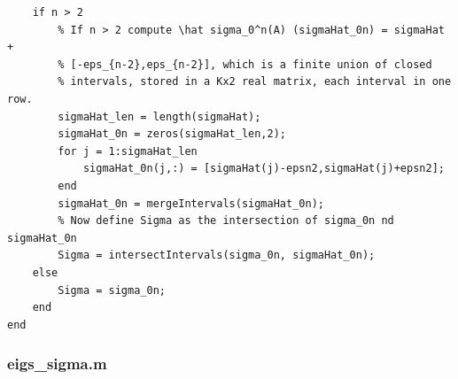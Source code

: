 \documentclass[preprint,1p,11pt]{elsarticle}
\numberwithin{equation}{section}   %
\numberwithin{figure}{section}  %
\begin{document}
\begin{verbatim}
    if n > 2
        % If n > 2 compute \hat sigma_0^n(A) (sigmaHat_0n) = sigmaHat + 
        % [-eps_{n-2},eps_{n-2}], which is a finite union of closed 
        % intervals, stored in a Kx2 real matrix, each interval in one row.
        sigmaHat_len = length(sigmaHat);
        sigmaHat_0n = zeros(sigmaHat_len,2);
        for j = 1:sigmaHat_len
            sigmaHat_0n(j,:) = [sigmaHat(j)-epsn2,sigmaHat(j)+epsn2];
        end
        sigmaHat_0n = mergeIntervals(sigmaHat_0n);
        % Now define Sigma as the intersection of sigma_0n nd sigmaHat_0n
        Sigma = intersectIntervals(sigma_0n, sigmaHat_0n);
    else
        Sigma = sigma_0n;
    end
end
\end{verbatim}

\subsubsection{eigs\_sigma.m} \label{code:es}
\end{document}
